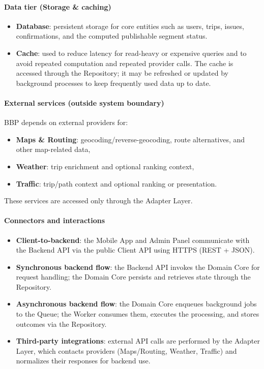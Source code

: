 \paragraph{Data tier (Storage \& caching)}
\begin{itemize}
	\item \textbf{Database}: persistent storage for core entities such as users, trips, issues, confirmations, and the computed publishable segment status.
	\item \textbf{Cache}: used to reduce latency for read-heavy or expensive queries and to avoid repeated computation and repeated provider calls. The cache is accessed through the Repository; it may be refreshed or updated by background processes to keep frequently used data up to date.
\end{itemize}

\paragraph{External services (outside system boundary)}
BBP depends on external providers for:
\begin{itemize}
	\item \textbf{Maps \& Routing}: geocoding/reverse-geocoding, route alternatives, and other map-related data,
	\item \textbf{Weather}: trip enrichment and optional ranking context,
	\item \textbf{Traffic}: trip/path context and optional ranking or presentation.
\end{itemize}
These services are accessed only through the Adapter Layer.

\paragraph{Connectors and interactions}
\begin{itemize}
	\item \textbf{Client-to-backend}: the Mobile App and Admin Panel communicate with the Backend API via the public Client API using HTTPS (REST + JSON).
	\item \textbf{Synchronous backend flow}: the Backend API invokes the Domain Core for request handling; the Domain Core persists and retrieves state through the Repository.
	\item \textbf{Asynchronous backend flow}: the Domain Core enqueues background jobs to the Queue; the Worker consumes them, executes the processing, and stores outcomes via the Repository.
	\item \textbf{Third-party integrations}: external API calls are performed by the Adapter Layer, which contacts providers (Maps/Routing, Weather, Traffic) and normalizes their responses for backend use.
\end{itemize}

